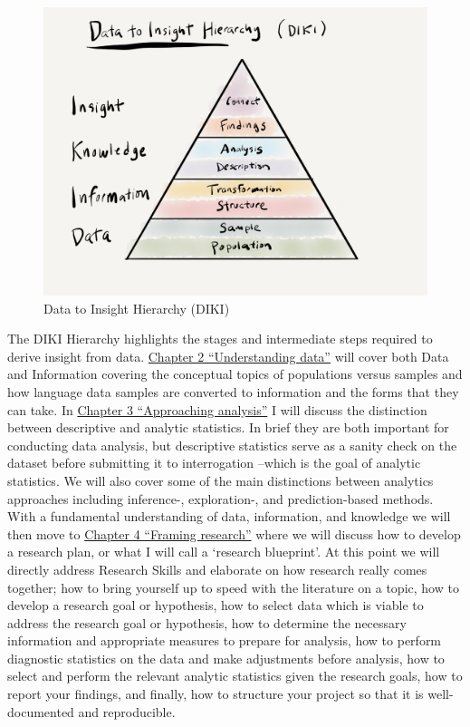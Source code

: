 \documentclass[
  letterpaper,
]{scrbook}
\begin{document}
\begin{figure}[h]

{\centering \includegraphics[width=7.2in,height=\textheight]{./figures/text-analysis/diki-hierarchy-paper.png}

}

\caption{\label{fig-diki-hierarchy}Data to Insight Hierarchy (DIKI)}

\end{figure}

The DIKI Hierarchy highlights the stages and intermediate steps required
to derive insight from data.
\protect\hyperlink{sec-understanding-data}{Chapter 2 ``Understanding
data''} will cover both Data and Information covering the conceptual
topics of populations versus samples and how language data samples are
converted to information and the forms that they can take. In
\protect\hyperlink{sec-approaching-analysis}{Chapter 3 ``Approaching
analysis''} I will discuss the distinction between descriptive and
analytic statistics. In brief they are both important for conducting
data analysis, but descriptive statistics serve as a sanity check on the
dataset before submitting it to interrogation --which is the goal of
analytic statistics. We will also cover some of the main distinctions
between analytics approaches including inference-, exploration-, and
prediction-based methods. With a fundamental understanding of data,
information, and knowledge we will then move to
\protect\hyperlink{framing-research-chapter}{Chapter 4 ``Framing
research''} where we will discuss how to develop a research plan, or
what I will call a `research blueprint'. At this point we will directly
address Research Skills and elaborate on how research really comes
together; how to bring yourself up to speed with the literature on a
topic, how to develop a research goal or hypothesis, how to select data
which is viable to address the research goal or hypothesis, how to
determine the necessary information and appropriate measures to prepare
for analysis, how to perform diagnostic statistics on the data and make
adjustments before analysis, how to select and perform the relevant
analytic statistics given the research goals, how to report your
findings, and finally, how to structure your project so that it is
well-documented and reproducible.
\end{document}
